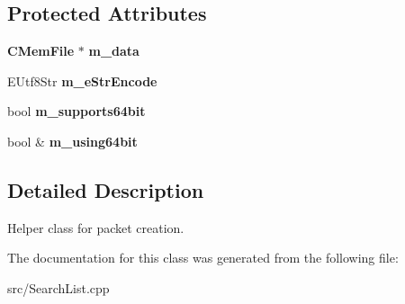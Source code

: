 \subsection*{Protected Attributes}
\begin{DoxyCompactItemize}
\item 
{\bf CMemFile} $\ast$ {\bfseries m\_\-data}\label{classCSearchExprTarget_adc200e329827684c7779a1ff48090642}

\item 
EUtf8Str {\bfseries m\_\-eStrEncode}\label{classCSearchExprTarget_adbe85b82429295b076199e0355652002}

\item 
bool {\bfseries m\_\-supports64bit}\label{classCSearchExprTarget_ae2f5e17830a47c594678239c9a058e9d}

\item 
bool \& {\bfseries m\_\-using64bit}\label{classCSearchExprTarget_a52036e63dd1f4810e890f31bd11623ff}

\end{DoxyCompactItemize}


\subsection{Detailed Description}
Helper class for packet creation. 

The documentation for this class was generated from the following file:\begin{DoxyCompactItemize}
\item 
src/SearchList.cpp\end{DoxyCompactItemize}
